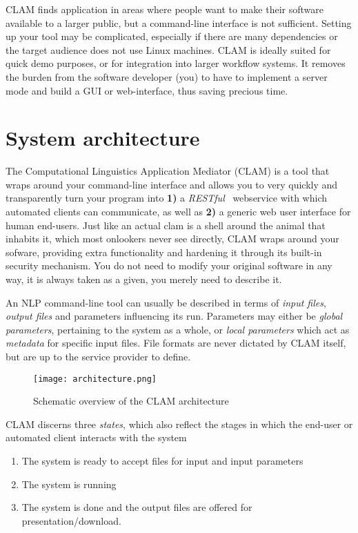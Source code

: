 \documentclass[11pt]{article}
\begin{document}
CLAM finds application in areas where people want to make their software
available to a larger public, but a command-line interface is not sufficient.
Setting up your tool may be complicated, especially if there are many
dependencies or the target audience does not use Linux machines. CLAM is
ideally suited for quick demo purposes, or for integration into larger workflow
systems. It removes the burden from the software developer (you) to have to
implement a server mode and build a GUI or web-interface, thus saving precious
time.

\section{System architecture}

The Computational Linguistics Application Mediator (CLAM) is a tool that wraps
around your command-line interface and allows you to very quickly and
transparently turn your program into \textbf{1)} a \emph{RESTful}~\cite{REST}
webservice with which automated clients can communicate, as well as \textbf{2)}
a generic web user interface for human end-users. Just like an actual clam is a
shell around the animal that inhabits it, which most onlookers never see
directly, CLAM wraps around your sofware, providing extra functionality and
hardening it through its built-in security mechanism. You do not need to modify
your original software in any way, it is always taken as a given, you merely
need to describe it. 

An NLP command-line tool can usually be described in terms of \emph{input
files}, \emph{output files} and parameters influencing its run. Parameters may
either be \emph{global parameters}, pertaining to the system as a whole, or
\emph{local parameters} which act as \emph{metadata} for specific input files. File
formats are never dictated by CLAM itself, but are up to the service provider
to define.

\begin{figure}[htb]
\begin{center}
\texttt{[image: architecture.png]}
\end{center}
\caption{Schematic overview of the CLAM architecture}
\label{fig:arch} 
\end{figure}

CLAM discerns three \emph{states}, which also reflect the stages in which
the end-user or automated client interacts with the system

\begin{enumerate}[noitemsep]
  \item The system is ready to accept files for input and input parameters
  \item The system is running
  \item The system is done and the output files are offered for presentation/download.
\end{enumerate}
\end{document}
